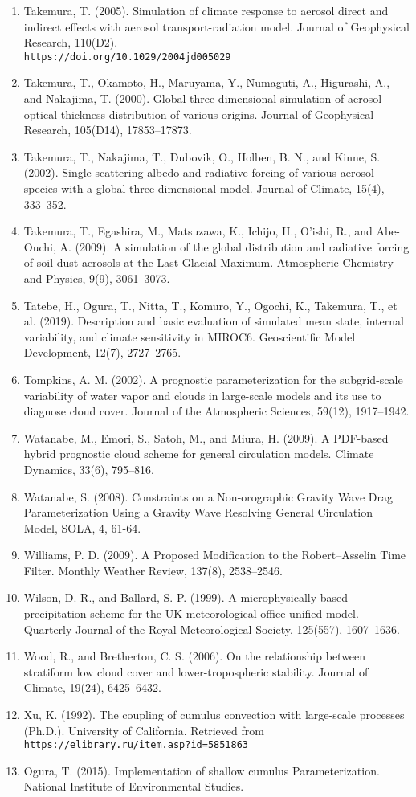 \begin{enumerate}
\item Takemura, T. (2005). Simulation of climate response to aerosol direct and indirect effects with aerosol transport-radiation model. Journal of Geophysical Research, 110(D2). \\
\texttt{https://doi.org/10.1029/2004jd005029}
\item Takemura, T., Okamoto, H., Maruyama, Y., Numaguti, A., Higurashi, A., and Nakajima, T. (2000). Global three-dimensional simulation of aerosol optical thickness distribution of various origins. Journal of Geophysical Research, 105(D14), 17853–17873.
\item Takemura, T., Nakajima, T., Dubovik, O., Holben, B. N., and Kinne, S. (2002). Single-scattering albedo and radiative forcing of various aerosol species with a global three-dimensional model. Journal of Climate, 15(4), 333–352.
\item Takemura, T., Egashira, M., Matsuzawa, K., Ichijo, H., O’ishi, R., and Abe-Ouchi, A. (2009). A simulation of the global distribution and radiative forcing of soil dust aerosols at the Last Glacial Maximum. Atmospheric Chemistry and Physics, 9(9), 3061–3073.
\item Tatebe, H., Ogura, T., Nitta, T., Komuro, Y., Ogochi, K., Takemura, T., et al. (2019). Description and basic evaluation of simulated mean state, internal variability, and climate sensitivity in MIROC6. Geoscientific Model Development, 12(7), 2727–2765.
\item Tompkins, A. M. (2002). A prognostic parameterization for the subgrid-scale variability of water vapor and clouds in large-scale models and its use to diagnose cloud cover. Journal of the Atmospheric Sciences, 59(12), 1917–1942.
\item Watanabe, M., Emori, S., Satoh, M., and Miura, H. (2009). A PDF-based hybrid prognostic cloud scheme for general circulation models. Climate Dynamics, 33(6), 795–816.
\item Watanabe, S. (2008). Constraints on a Non-orographic Gravity Wave Drag Parameterization Using a Gravity Wave Resolving General Circulation Model, SOLA, 4, 61-64.
\item Williams, P. D. (2009). A Proposed Modification to the Robert–Asselin Time Filter. Monthly Weather Review, 137(8), 2538–2546.
\item Wilson, D. R., and Ballard, S. P. (1999). A microphysically based precipitation scheme for the UK meteorological office unified model. Quarterly Journal of the Royal Meteorological Society, 125(557), 1607–1636.
\item Wood, R., and Bretherton, C. S. (2006). On the relationship between stratiform low cloud cover and lower-tropospheric stability. Journal of Climate, 19(24), 6425–6432.
\item Xu, K. (1992). The coupling of cumulus convection with large-scale processes (Ph.D.). University of California. Retrieved from \\
\texttt{https://elibrary.ru/item.asp?id=5851863}
\item Ogura, T. (2015). Implementation of shallow cumulus Parameterization. National Institute of Environmental Studies.
\end{enumerate}
